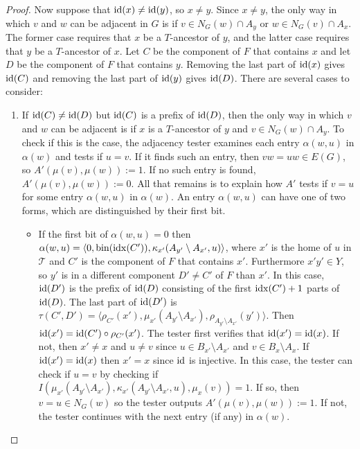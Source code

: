 \begin{proof}
  Now suppose that $\operatorname{id}(x)\neq\operatorname{id}(y)$, so $x\neq y$. Since $x\neq y$, the only way in which $v$ and $w$ can be adjacent in $G$ is if $v\in N_G(w)\cap A_y$ or $w\in N_G(v)\cap A_x$.  The former case requires that $x$ be a $T$-ancestor of $y$, and the latter case requires that $y$ be a $T$-ancestor of $x$.  Let $C$ be the component of $F$ that contains $x$ and let $D$ be the component of $F$ that contains $y$.  Removing the last part of $\operatorname{id}(x)$ gives $\operatorname{id}(C)$ and removing the last part of $\operatorname{id}(y)$ gives $\operatorname{id}(D)$.  There are several cases to consider:
  \begin{enumerate}
    \item If $\operatorname{id}(C)\neq\operatorname{id}(D)$ but $\operatorname{id}(C)$ is a prefix of $\operatorname{id}(D)$, then the only way in which $v$ and $w$ can be adjacent is if $x$ is a $T$-ancestor of $y$ and $v\in N_G(w)\cap A_y$.  To check if this is the case, the adjacency tester 
    examines each entry $\alpha(w,u)$ in $\alpha(w)$ and tests if $u=v$.  If it finds such an entry, then $vw=uw\in E(G)$, so $A'(\mu(v),\mu(w)):=1$. If no such entry is found, $A'(\mu(v),\mu(w)):=0$. All that remains is to explain how $A'$ tests if $v=u$ for some entry $\alpha(w,u)$ in $\alpha(w)$. An entry $\alpha(w,u)$ can have one of two forms, which are distinguished by their first bit.
    \begin{itemize}
      \item If the first bit of $\alpha(w,u)=0$ then $\alpha(w,u)=\langle 0,\operatorname{bin}(\operatorname{idx}(C')), \kappa_{x'}(A_{y'}\setminus A_{x'}, u)\rangle$, where $x'$ is the home of $u$ in $\mathcal{T}$ and $C'$ is the component of $F$ that contains $x'$. Furthermore $x'y'\in Y$, so $y'$ is in a different component $D'\neq C'$ of $F$ than $x'$. In this case, $\operatorname{id}(D')$ is the prefix of $\operatorname{id}(D)$ consisting of the first $\operatorname{idx}(C')+1$ parts of $\operatorname{id}(D)$. The last part of $\operatorname{id}(D')$ is $\tau(C',D')=\langle \rho_{C'}(x'), \mu_{x'}(A_{y'}\setminus A_{x'}), \rho_{A_{y'}\setminus A_{x'}}(y')\rangle$.  Then $\operatorname{id}(x')=\operatorname{id}(C')\circ\rho_{C'}(x')$.  The tester first verifies that $\operatorname{id}(x')=\operatorname{id}(x)$.  If not, then $x'\neq x$ and $u\neq v$ since $u\in B_{x'}\setminus A_{x'}$ and $v\in B_x\setminus A_x$. If $\operatorname{id}(x')=\operatorname{id}(x)$ then $x'=x$ since $\operatorname{id}$ is injective.  In this case, the tester can check if $u=v$ by checking if $I(\mu_{x'}(A_{y'}\setminus A_{x'}),\kappa_{x'}(A_{y'}\setminus A_{x'}, u), \mu_{x}(v))=1$.  If so, then $v=u\in N_G(w)$ so the tester outputs $A'(\mu(v),\mu(w)):=1$.  If not, the tester continues with the next entry (if any) in $\alpha(w)$.
      

\end{itemize}
\end{enumerate}
\end{proof}
